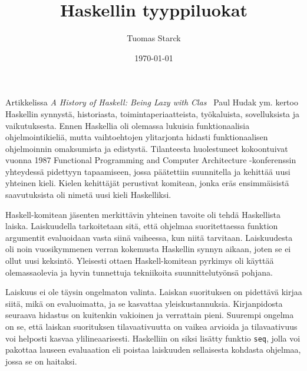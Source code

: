 \documentclass[finnish]{tktltiki2}
\title{Haskellin tyyppiluokat}
\author{Tuomas Starck}
\date{\today}
\begin{document}
\frontmatter

\maketitle
\makeabstract

\tableofcontents

\mainmatter


Artikkelissa \emph{A History of Haskell: Being Lazy with Clas}~\cite{Hudak:2007:HHL:1238844.1238856} Paul Hudak ym. kertoo Haskellin synnystä, historiasta, toimintaperiaatteista, työkaluista, sovelluksista ja vaikutuksesta. Ennen Haskellia oli olemassa lukuisia funktionaalisia ohjelmointikieliä, mutta vaihtoehtojen ylitarjonta hidasti funktionaalisen ohjelmoinnin omaksumista ja edistystä. Tilanteesta huolestuneet kokoontuivat vuonna 1987 Functional Programming and Computer Architecture -konferenssin yhteydessä pidettyyn tapaamiseen, jossa päätettiin suunnitella ja kehittää uusi yhteinen kieli. Kielen kehittäjät perustivat komitean, jonka eräs ensimmäisistä saavutuksista oli nimetä uusi kieli Haskelliksi.



Haskell-komitean jäsenten merkittävin yhteinen tavoite oli tehdä Haskellista laiska. Laiskuudella tarkoitetaan sitä, että ohjelmaa suoritettaessa funktion argumentit evaluoidaan vasta siinä vaiheessa, kun niitä tarvitaan. Laiskuudesta oli noin vuosikymmenen verran kokemusta Haskellin synnyn aikaan, joten se ei ollut uusi keksintö. Yleisesti ottaen Haskell-komitean pyrkimys oli käyttää olemassaolevia ja hyvin tunnettuja tekniikoita suunnittelutyönsä pohjana.

Laiskuus ei ole täysin ongelmaton valinta. Laiskan suorituksen on pidettävä kirjaa siitä, mikä on evaluoimatta, ja se kasvattaa yleiskustannuksia. Kirjanpidosta seuraava hidastus on kuitenkin vakioinen ja verrattain pieni. Suurempi ongelma on se, että laiskan suorituksen tilavaativuutta on vaikea arvioida ja tilavaativuus voi helposti kasvaa ylilineaarisesti. Haskelliin on siksi lisätty funktio \texttt{seq}, jolla voi pakottaa lauseen evaluaation eli poistaa laiskuuden sellaisesta kohdasta ohjelmaa, jossa se on haitaksi.
\end{document}
